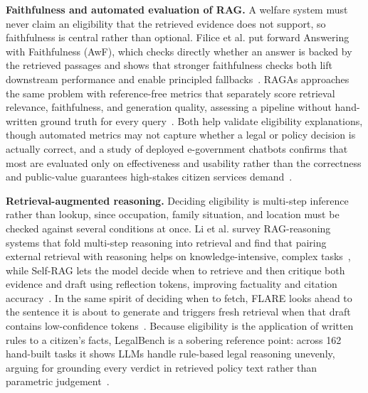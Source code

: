 \documentclass[conference]{IEEEtran}
\begin{document}
\textbf{Faithfulness and automated evaluation of RAG.} A welfare system must never claim an eligibility that the retrieved evidence does not support, so faithfulness is central rather than optional. Filice et al. put forward Answering with Faithfulness (AwF), which checks directly whether an answer is backed by the retrieved passages and shows that stronger faithfulness checks both lift downstream performance and enable principled fallbacks~\cite{filice2025awf}. RAGAs approaches the same problem with reference-free metrics that separately score retrieval relevance, faithfulness, and generation quality, assessing a pipeline without hand-written ground truth for every query~\cite{es2024ragas}. Both help validate eligibility explanations, though automated metrics may not capture whether a legal or policy decision is actually correct, and a study of deployed e-government chatbots confirms that most are evaluated only on effectiveness and usability rather than the correctness and public-value guarantees high-stakes citizen services demand~\cite{cortes2023egov}.

\textbf{Retrieval-augmented reasoning.} Deciding eligibility is multi-step inference rather than lookup, since occupation, family situation, and location must be checked against several conditions at once. Li et al. survey RAG-reasoning systems that fold multi-step reasoning into retrieval and find that pairing external retrieval with reasoning helps on knowledge-intensive, complex tasks~\cite{li2025ragreasoning}, while Self-RAG lets the model decide when to retrieve and then critique both evidence and draft using reflection tokens, improving factuality and citation accuracy~\cite{asai2024selfrag}. In the same spirit of deciding when to fetch, FLARE looks ahead to the sentence it is about to generate and triggers fresh retrieval when that draft contains low-confidence tokens~\cite{jiang2023flare}. Because eligibility is the application of written rules to a citizen's facts, LegalBench is a sobering reference point: across 162 hand-built tasks it shows LLMs handle rule-based legal reasoning unevenly, arguing for grounding every verdict in retrieved policy text rather than parametric judgement~\cite{guha2023legalbench}.
\end{document}
